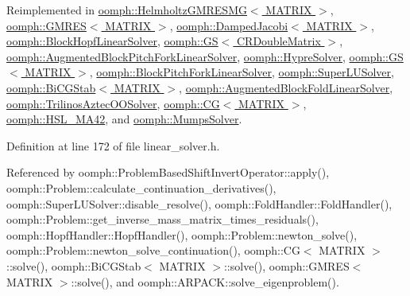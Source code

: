Reimplemented in \hyperlink{classoomph_1_1HelmholtzGMRESMG_ad6937ea7f72719eb9e33c28c002fa380}{oomph\+::\+Helmholtz\+G\+M\+R\+E\+S\+M\+G$<$ M\+A\+T\+R\+I\+X $>$}, \hyperlink{classoomph_1_1GMRES_a18e32688dcbd8806f1f23d754fc712a3}{oomph\+::\+G\+M\+R\+E\+S$<$ M\+A\+T\+R\+I\+X $>$}, \hyperlink{classoomph_1_1DampedJacobi_a571fae40f40b528e76a0636f140010e7}{oomph\+::\+Damped\+Jacobi$<$ M\+A\+T\+R\+I\+X $>$}, \hyperlink{classoomph_1_1BlockHopfLinearSolver_a2c0e342f253917e987f8504b16862b2c}{oomph\+::\+Block\+Hopf\+Linear\+Solver}, \hyperlink{classoomph_1_1GS_3_01CRDoubleMatrix_01_4_ae03a5216cba7878a728bda9186be5d15}{oomph\+::\+G\+S$<$ C\+R\+Double\+Matrix $>$}, \hyperlink{classoomph_1_1AugmentedBlockPitchForkLinearSolver_a1d617896a3f1c1b1236ff18dc87ed8d7}{oomph\+::\+Augmented\+Block\+Pitch\+Fork\+Linear\+Solver}, \hyperlink{classoomph_1_1HypreSolver_a892df4a9377dfa5ec978a74badb61423}{oomph\+::\+Hypre\+Solver}, \hyperlink{classoomph_1_1GS_af47ff132824a557b738f3d4ad12d5094}{oomph\+::\+G\+S$<$ M\+A\+T\+R\+I\+X $>$}, \hyperlink{classoomph_1_1BlockPitchForkLinearSolver_a9a424fd2ae0b67ef8c3ff59f16030786}{oomph\+::\+Block\+Pitch\+Fork\+Linear\+Solver}, \hyperlink{classoomph_1_1SuperLUSolver_acef6e1b3bf469061777866d97689ba77}{oomph\+::\+Super\+L\+U\+Solver}, \hyperlink{classoomph_1_1BiCGStab_a3694a08628f3567caa5f20bb5dcfe677}{oomph\+::\+Bi\+C\+G\+Stab$<$ M\+A\+T\+R\+I\+X $>$}, \hyperlink{classoomph_1_1AugmentedBlockFoldLinearSolver_a7728fc74802b6802ed966765bc1e62d9}{oomph\+::\+Augmented\+Block\+Fold\+Linear\+Solver}, \hyperlink{classoomph_1_1TrilinosAztecOOSolver_a022f537f95c0bf352bab739f2f58bd7f}{oomph\+::\+Trilinos\+Aztec\+O\+O\+Solver}, \hyperlink{classoomph_1_1CG_a147e640c19c2159285da0b3b5c51af63}{oomph\+::\+C\+G$<$ M\+A\+T\+R\+I\+X $>$}, \hyperlink{classoomph_1_1HSL__MA42_ad59ac679b479c977c8611065c5bea91b}{oomph\+::\+H\+S\+L\+\_\+\+M\+A42}, and \hyperlink{classoomph_1_1MumpsSolver_a849d13cac2177452446c2ec387a0260f}{oomph\+::\+Mumps\+Solver}.



Definition at line 172 of file linear\+\_\+solver.\+h.



Referenced by oomph\+::\+Problem\+Based\+Shift\+Invert\+Operator\+::apply(), oomph\+::\+Problem\+::calculate\+\_\+continuation\+\_\+derivatives(), oomph\+::\+Super\+L\+U\+Solver\+::disable\+\_\+resolve(), oomph\+::\+Fold\+Handler\+::\+Fold\+Handler(), oomph\+::\+Problem\+::get\+\_\+inverse\+\_\+mass\+\_\+matrix\+\_\+times\+\_\+residuals(), oomph\+::\+Hopf\+Handler\+::\+Hopf\+Handler(), oomph\+::\+Problem\+::newton\+\_\+solve(), oomph\+::\+Problem\+::newton\+\_\+solve\+\_\+continuation(), oomph\+::\+C\+G$<$ M\+A\+T\+R\+I\+X $>$\+::solve(), oomph\+::\+Bi\+C\+G\+Stab$<$ M\+A\+T\+R\+I\+X $>$\+::solve(), oomph\+::\+G\+M\+R\+E\+S$<$ M\+A\+T\+R\+I\+X $>$\+::solve(), and oomph\+::\+A\+R\+P\+A\+C\+K\+::solve\+\_\+eigenproblem().

